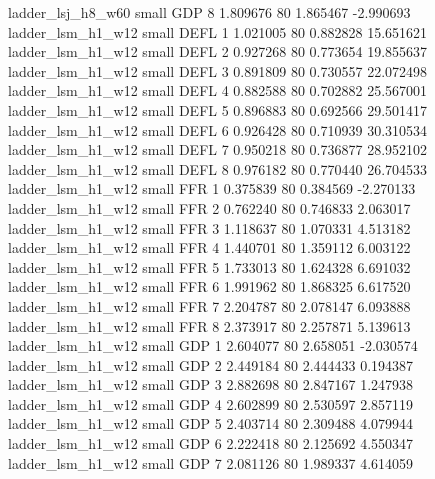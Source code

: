        ladder_lsj_h8_w60      small      GDP                 8 1.809676 80       1.865467          -2.990693
       ladder_lsm_h1_w12      small     DEFL                 1 1.021005 80       0.882828          15.651621
       ladder_lsm_h1_w12      small     DEFL                 2 0.927268 80       0.773654          19.855637
       ladder_lsm_h1_w12      small     DEFL                 3 0.891809 80       0.730557          22.072498
       ladder_lsm_h1_w12      small     DEFL                 4 0.882588 80       0.702882          25.567001
       ladder_lsm_h1_w12      small     DEFL                 5 0.896883 80       0.692566          29.501417
       ladder_lsm_h1_w12      small     DEFL                 6 0.926428 80       0.710939          30.310534
       ladder_lsm_h1_w12      small     DEFL                 7 0.950218 80       0.736877          28.952102
       ladder_lsm_h1_w12      small     DEFL                 8 0.976182 80       0.770440          26.704533
       ladder_lsm_h1_w12      small      FFR                 1 0.375839 80       0.384569          -2.270133
       ladder_lsm_h1_w12      small      FFR                 2 0.762240 80       0.746833           2.063017
       ladder_lsm_h1_w12      small      FFR                 3 1.118637 80       1.070331           4.513182
       ladder_lsm_h1_w12      small      FFR                 4 1.440701 80       1.359112           6.003122
       ladder_lsm_h1_w12      small      FFR                 5 1.733013 80       1.624328           6.691032
       ladder_lsm_h1_w12      small      FFR                 6 1.991962 80       1.868325           6.617520
       ladder_lsm_h1_w12      small      FFR                 7 2.204787 80       2.078147           6.093888
       ladder_lsm_h1_w12      small      FFR                 8 2.373917 80       2.257871           5.139613
       ladder_lsm_h1_w12      small      GDP                 1 2.604077 80       2.658051          -2.030574
       ladder_lsm_h1_w12      small      GDP                 2 2.449184 80       2.444433           0.194387
       ladder_lsm_h1_w12      small      GDP                 3 2.882698 80       2.847167           1.247938
       ladder_lsm_h1_w12      small      GDP                 4 2.602899 80       2.530597           2.857119
       ladder_lsm_h1_w12      small      GDP                 5 2.403714 80       2.309488           4.079944
       ladder_lsm_h1_w12      small      GDP                 6 2.222418 80       2.125692           4.550347
       ladder_lsm_h1_w12      small      GDP                 7 2.081126 80       1.989337           4.614059
